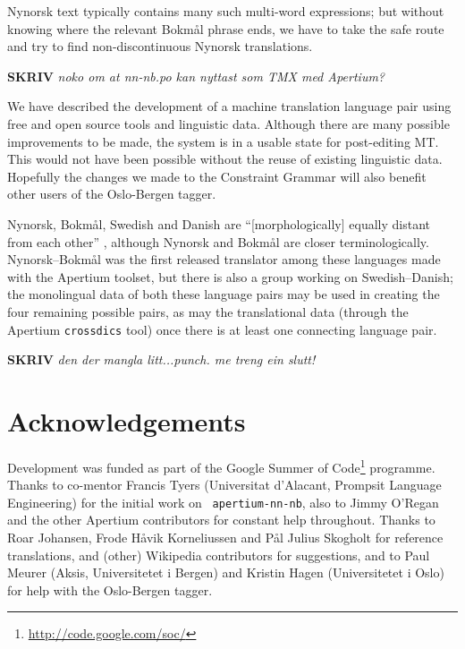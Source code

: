 \documentclass[11pt]{article}
\newcommand{\comment}[1]{\textbf{SKRIV} {\it #1}}
\begin{document}
Nynorsk text typically contains many such multi-word expressions; but
without knowing where the relevant Bokmål phrase ends, we have to take
the safe route and try to find non-discontinuous Nynorsk translations.

\comment{ noko om at nn-nb.po kan nyttast som TMX med Apertium?}

We have described the development of a machine translation language
pair using free and open source tools and linguistic data. Although
there are many possible improvements to be made, the system is in a
usable state for post-editing MT. This would not have been possible
without the reuse of existing linguistic data. Hopefully the changes
we made to the Constraint Grammar will also benefit other users of the
Oslo-Bergen tagger. 

Nynorsk, Bokmål, Swedish and Danish are ``[morphologically] equally
distant from each other'' \citep[p.~1]{everson2000sln}, although
Nynorsk and Bokmål are closer terminologically. Nynorsk–Bokmål was the
first released translator among these languages made with the Apertium
toolset, but there is also a group working on Swedish–Danish; the
monolingual data of both these language pairs may be used in creating
the four remaining possible pairs, as may the translational data
(through the Apertium {\tt crossdics} tool) once there is at least one
connecting language pair. 

\comment{den der mangla litt...punch. me treng ein slutt!}


\section*{Acknowledgements}

Development was funded as part of the Google Summer of
Code\footnote{\href{http://code.google.com/soc/}{http://code.google.com/soc/}
} programme. Thanks to co-mentor Francis Tyers (Universitat d'Alacant,
Prompsit Language Engineering) for the initial work on {\tt
  apertium-nn-nb}, also to Jimmy O'Regan and the other Apertium
contributors for constant help throughout. Thanks to Roar Johansen,
Frode Håvik Korneliussen and Pål Julius Skogholt for reference
translations, and (other) Wikipedia contributors for suggestions, and
to Paul Meurer (Aksis, Universitetet i Bergen) and Kristin Hagen
(Universitetet i Oslo) for help with the Oslo-Bergen tagger.




\end{document}
